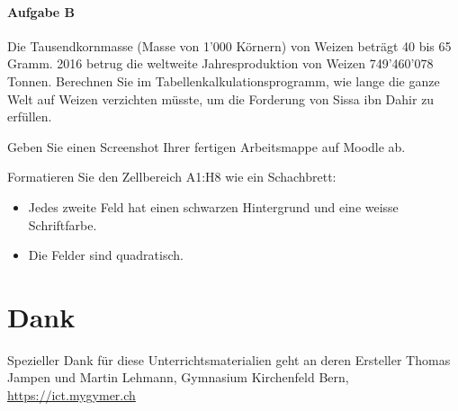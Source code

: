 \begin{myexercise}[Weizenkornlegende]
    \paragraph*{Aufgabe B}
    Die Tausendkornmasse (Masse von 1'000 Körnern) von Weizen beträgt 40 bis 65 Gramm. 2016 betrug die weltweite Jahresproduktion von Weizen 749'460'078 Tonnen. Berechnen Sie im Tabellenkalkulationsprogramm, wie lange die ganze Welt auf Weizen verzichten müsste, um die Forderung von Sissa ibn Dahir zu erfüllen.

    Geben Sie einen Screenshot Ihrer fertigen Arbeitsmappe auf Moodle ab.
\end{myexercise}
\begin{mychallenge}
    Formatieren Sie den Zellbereich A1:H8 wie ein Schachbrett:
    \begin{itemize}
        \item Jedes zweite Feld hat einen schwarzen Hintergrund und eine weisse Schriftfarbe.
        \item Die Felder sind quadratisch.
    \end{itemize}
\end{mychallenge}





\section*{Dank}
Spezieller Dank für diese Unterrichtsmaterialien geht an deren Ersteller Thomas Jampen und Martin Lehmann, Gymnasium Kirchenfeld Bern, \url{https://ict.mygymer.ch}

